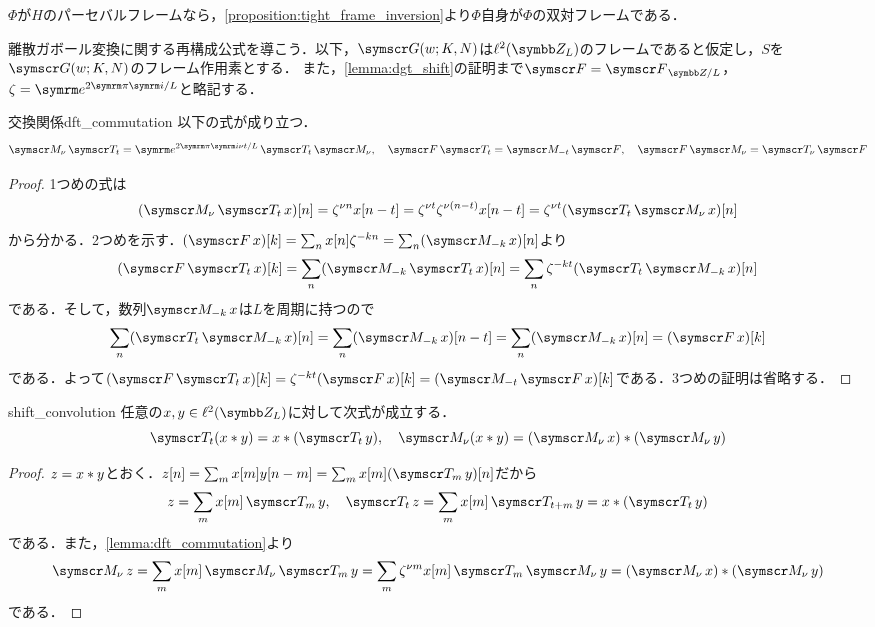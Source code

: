 \documentclass[../../main]{subfiles}
\begin{document}
\begin{example}
  \(\Phi\)が\(H\)のパーセバルフレームなら，\cref{proposition:tight_frame_inversion}より\(\Phi\)自身が\(\Phi\)の双対フレームである．
\end{example}

離散ガボール変換に関する再構成公式を導こう．以下，\(\gaborsys{w}{K}{N}\)は\(\cycles{L}\)のフレームであると仮定し，\(S\)を\(\gaborsys{w}{K}{N}\)のフレーム作用素とする．
また，\cref{lemma:dgt_shift}の証明まで\(\ftrans=\dft{L}\)，\(\zeta=\napr^{2\krez\iuni/L}\)と略記する．

\begin{lemma}{交換関係}{dft_commutation}
  以下の式が成り立つ．
  \[
    \modulate{\nu}\translate{t} = \napr^{2\krez\iuni\nu t/L}\translate{t}\modulate{\nu},
    \quad\ftrans\translate{t} = \modulate{-t}\ftrans,
    \quad\ftrans\modulate{\nu} = \translate{\nu}\ftrans
  \]
\end{lemma}

\begin{proof}
  1つめの式は
  \[
    (\modulate{\nu}\translate{t}x)[n]=\zeta^{\nu n}x[n-t]=\zeta^{\nu t}\zeta^{\nu(n-t)}x[n-t]=\zeta^{\nu t}(\translate{t}\modulate{\nu}x)[n]
  \]
  から分かる．2つめを示す．\((\ftrans x)[k]=\sum_nx[n]\zeta^{-kn}=\sum_n(\modulate{-k}x)[n]\)より
  \[
    (\ftrans\translate{t}x)[k] = \sum_n(\modulate{-k}\translate{t}x)[n]
    = \sum_n\zeta^{-kt}(\translate{t}\modulate{-k}x)[n]
  \]
  である．そして，数列\(\modulate{-k}x\)は\(L\)を周期に持つので
  \[
    \sum_n(\translate{t}\modulate{-k}x)[n] = \sum_n(\modulate{-k}x)[n-t]
    = \sum_n(\modulate{-k}x)[n]
    = (\ftrans x)[k]
  \]
  である．よって\((\ftrans\translate{t}x)[k]=\zeta^{-kt}(\ftrans x)[k]=(\modulate{-t}\ftrans x)[k]\)である．3つめの証明は省略する．
\end{proof}

\begin{lemma}{}{shift_convolution}
  任意の\(x,y\in\cycles{L}\)に対して次式が成立する．
  \[
    \translate{t}(x\circconv y) = x\circconv(\translate{t}y),
    \quad\modulate{\nu}(x\circconv y) = (\modulate{\nu}x)\circconv(\modulate{\nu}y)
  \]
\end{lemma}

\begin{proof}
  \(z=x\ast y\)とおく．\(z[n]=\sum_mx[m]y[n-m]=\sum_mx[m](\translate{m}y)[n]\)だから
  \[
    z = \sum_mx[m]\translate{m}y,
    \quad\translate{t}z = \sum_mx[m]\translate{t+m}y
    = x\circconv(\translate{t}y)
  \]
  である．また，\cref{lemma:dft_commutation}より
  \[
    \modulate{\nu}z = \sum_mx[m]\modulate{\nu}\translate{m}y
    = \sum_m\zeta^{\nu m}x[m]\translate{m}\modulate{\nu}y
    = (\modulate{\nu}x)\circconv(\modulate{\nu}y)
  \]
  である．
\end{proof}
\end{document}
